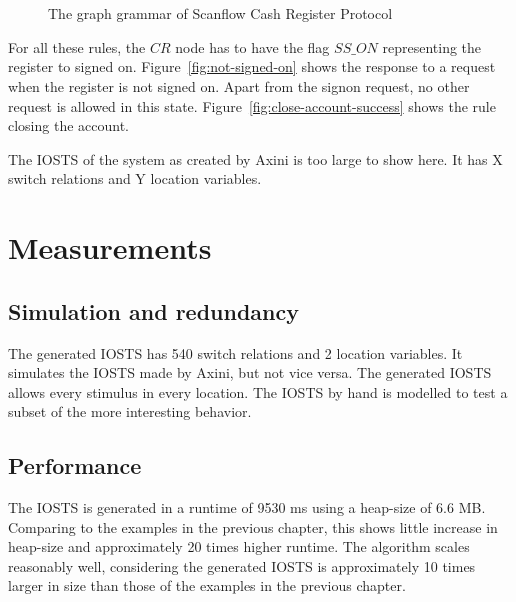 \begin{figure}[ht]
  \begin{center}
    \hspace{20px}
    \\
    \hspace{20px}
    \\
    \hspace{20px}
  \end{center}
  \caption{The graph grammar of Scanflow Cash Register Protocol}
  \label{fig:gg-fwgc}
\end{figure}

For all these rules, the $CR$ node has to have the flag $\mathit{SS\_ON}$ representing the register to signed on. Figure~\ref{fig:not-signed-on} shows the response to a request when the register is not signed on. Apart from the signon request, no other request is allowed in this state. Figure~\ref{fig:close-account-success} shows the rule closing the account.

The IOSTS of the system as created by Axini is too large to show here. It has X switch relations and Y location variables. 


\section{Measurements}

\subsection{Simulation and redundancy}
The generated IOSTS has 540 switch relations and 2 location variables. It simulates the IOSTS made by Axini, but not vice versa. The generated IOSTS allows every stimulus in every location. The IOSTS by hand is modelled to test a subset of the more interesting behavior.

\subsection{Performance}
The IOSTS is generated in a runtime of 9530 ms using a heap-size of 6.6 MB. Comparing to the examples in the previous chapter, this shows little increase in heap-size and approximately 20 times higher runtime. The algorithm scales reasonably well, considering the generated IOSTS is approximately 10 times larger in size than those of the examples in the previous chapter. 

